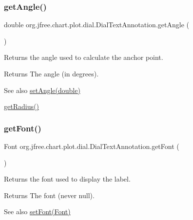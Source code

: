 \subsubsection{\texorpdfstring{get\+Angle()}{getAngle()}}
{\footnotesize\ttfamily double org.\+jfree.\+chart.\+plot.\+dial.\+Dial\+Text\+Annotation.\+get\+Angle (\begin{DoxyParamCaption}{ }\end{DoxyParamCaption})}

Returns the angle used to calculate the anchor point.

\begin{DoxyReturn}{Returns}
The angle (in degrees).
\end{DoxyReturn}
\begin{DoxySeeAlso}{See also}
\mbox{\hyperlink{classorg_1_1jfree_1_1chart_1_1plot_1_1dial_1_1_dial_text_annotation_a10212bd12fd87d4c9c8a89658fea5d09}{set\+Angle(double)}} 

\mbox{\hyperlink{classorg_1_1jfree_1_1chart_1_1plot_1_1dial_1_1_dial_text_annotation_a67f7b7e58b013b48901d0d80a22bbef5}{get\+Radius()}} 
\end{DoxySeeAlso}
\mbox{\label{classorg_1_1jfree_1_1chart_1_1plot_1_1dial_1_1_dial_text_annotation_ae6f8a6c1529da255183d2c72957ab9c0}} 
\subsubsection{\texorpdfstring{get\+Font()}{getFont()}}
{\footnotesize\ttfamily Font org.\+jfree.\+chart.\+plot.\+dial.\+Dial\+Text\+Annotation.\+get\+Font (\begin{DoxyParamCaption}{ }\end{DoxyParamCaption})}

Returns the font used to display the label.

\begin{DoxyReturn}{Returns}
The font (never {\ttfamily null}).
\end{DoxyReturn}
\begin{DoxySeeAlso}{See also}
\mbox{\hyperlink{classorg_1_1jfree_1_1chart_1_1plot_1_1dial_1_1_dial_text_annotation_ad278fcc853d254432be2fe0d9d9e15e5}{set\+Font(\+Font)}} 
\end{DoxySeeAlso}
\mbox{\label{classorg_1_1jfree_1_1chart_1_1plot_1_1dial_1_1_dial_text_annotation_a4a323befb5330a7235ab440acb7ed7f3}} 
